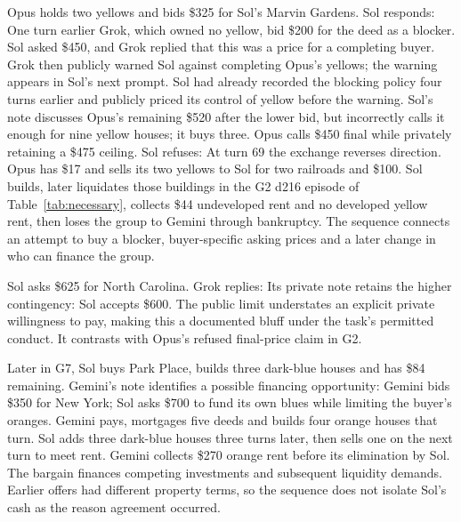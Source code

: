 Opus holds two yellows and bids \$325 for Sol's Marvin Gardens. Sol responds:
One turn earlier Grok, which owned no yellow, bid \$200 for the deed as a blocker. Sol asked \$450, and Grok replied that this was a price for a completing buyer. Grok then publicly warned Sol against completing Opus's yellows; the warning appears in Sol's next prompt. Sol had already recorded the blocking policy four turns earlier and publicly priced its control of yellow before the warning. Sol's note discusses Opus's remaining \$520 after the lower bid, but incorrectly calls it enough for nine yellow houses; it buys three. Opus calls \$450 final while privately retaining a \$475 ceiling. Sol refuses:
At turn 69 the exchange reverses direction. Opus has \$17 and sells its two yellows to Sol for two railroads and \$100. Sol builds, later liquidates those buildings in the G2 d216 episode of Table~\ref{tab:necessary}, collects \$44 undeveloped rent and no developed yellow rent, then loses the group to Gemini through bankruptcy. The sequence connects an attempt to buy a blocker, buyer-specific asking prices and a later change in who can finance the group.


Sol asks \$625 for North Carolina. Grok replies:
Its private note retains the higher contingency:
Sol accepts \$600. The public limit understates an explicit private willingness to pay, making this a documented bluff under the task's permitted conduct. It contrasts with Opus's refused final-price claim in G2.

Later in G7, Sol buys Park Place, builds three dark-blue houses and has \$84 remaining. Gemini's note identifies a possible financing opportunity:
Gemini bids \$350 for New York; Sol asks \$700 to fund its own blues while limiting the buyer's oranges. Gemini pays, mortgages five deeds and builds four orange houses that turn. Sol adds three dark-blue houses three turns later, then sells one on the next turn to meet rent. Gemini collects \$270 orange rent before its elimination by Sol. The bargain finances competing investments and subsequent liquidity demands. Earlier offers had different property terms, so the sequence does not isolate Sol's cash as the reason agreement occurred.



